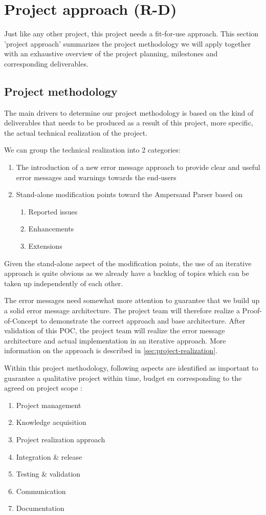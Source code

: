 \section{Project approach (R-D)}
\label{sec:project-approach}
Just like any other project, this project needs a fit-for-use approach. 
This section 'project approach' summarizes the project methodology we will apply together with an exhaustive overview of the project planning, milestones and corresponding deliverables.
\subsection{Project methodology}
The main drivers to determine our project methodology is based on the kind of deliverables that needs to be produced as a result of this project, more specific, the actual technical realization of the project.

We can group the technical realization into 2 categories:
\begin{enumerate}
	\item The introduction of a new error message approach to provide clear and useful error messages and warnings towards the end-users
	\item Stand-alone modification points toward the Ampersand Parser based on
	\begin{enumerate}
		\item Reported issues
		\item Enhancements
		\item Extensions
	\end {enumerate}
\end {enumerate}

Given the stand-alone aspect of the modification points, the use of an iterative approach is quite obvious as we already have a backlog of topics which can be taken up independently of each other. 

The error messages need somewhat more attention to guarantee that we build up a solid error message architecture. 
The project team will therefore realize a Proof-of-Concept to demonstrate the correct approach and base architecture. 
After validation of this POC, the project team will realize the error message architecture and actual implementation in an iterative approach.
More information on the approach is described in \autoref{sec:project-realization}.

Within this project methodology, following aspects are identified as important to guarantee a qualitative project within time, budget en corresponding to the agreed on project scope : 
\begin{enumerate}
	\item Project management
	\item Knowledge acquisition 
	\item Project realization approach
	\item Integration \& release
	\item Testing \& validation
	\item Communication
	\item Documentation
\end {enumerate}

